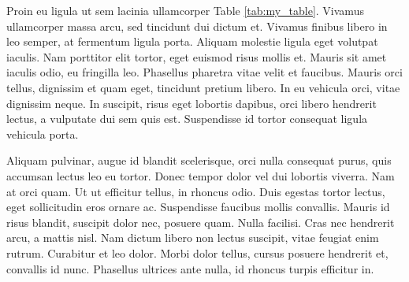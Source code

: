 \documentclass[11pt,twocolumn]{article}
\begin{document}
Proin eu ligula ut sem lacinia ullamcorper Table \ref{tab:my_table}. Vivamus ullamcorper massa arcu, sed tincidunt dui dictum et. Vivamus finibus libero in leo semper, at fermentum ligula porta. Aliquam molestie ligula eget volutpat iaculis. Nam porttitor elit tortor, eget euismod risus mollis et. Mauris sit amet iaculis odio, eu fringilla leo. Phasellus pharetra vitae velit et faucibus. Mauris orci tellus, dignissim et quam eget, tincidunt pretium libero. In eu vehicula orci, vitae dignissim neque. In suscipit, risus eget lobortis dapibus, orci libero hendrerit lectus, a vulputate dui sem quis est. Suspendisse id tortor consequat ligula vehicula porta.

Aliquam pulvinar, augue id blandit scelerisque, orci nulla consequat purus, quis accumsan lectus leo eu tortor. Donec tempor dolor vel dui lobortis viverra. Nam at orci quam. Ut ut efficitur tellus, in rhoncus odio. Duis egestas tortor lectus, eget sollicitudin eros ornare ac. Suspendisse faucibus mollis convallis. Mauris id risus blandit, suscipit dolor nec, posuere quam. Nulla facilisi. Cras nec hendrerit arcu, a mattis nisl. Nam dictum libero non lectus suscipit, vitae feugiat enim rutrum. Curabitur et leo dolor. Morbi dolor tellus, cursus posuere hendrerit et, convallis id nunc. Phasellus ultrices ante nulla, id rhoncus turpis efficitur in.




\end{document}
